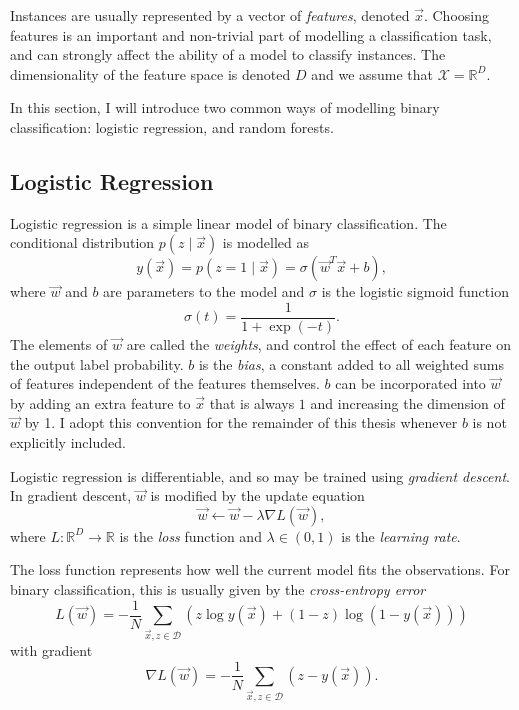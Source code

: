     Instances are usually represented by a vector of \emph{features}, denoted
    $\vec x$. Choosing features is an important and non-trivial part of
    modelling a classification task, and can strongly affect the ability of a
    model to classify instances. The dimensionality of the feature space is
    denoted $D$ and we assume that $\mathcal X = \mathbb{R}^D$.

    In this section, I will introduce two common ways of modelling binary
    classification: logistic regression, and random forests.

    \subsection{Logistic Regression}
    \label{sec:logistic-regression}

        Logistic regression is a simple linear model of binary classification.
        The conditional distribution $p(z \mid \vec x)$ is modelled as
        \[
            y(\vec x) = p(z = 1 \mid \vec x) = \sigma(\vec w^T \vec x + b),
        \]
        where $\vec w$ and $b$ are parameters to the model and $\sigma$ is the
        logistic sigmoid function
        \[
            \sigma(t) = \frac{1}{1 + \exp(-t)}.
        \]
        The elements of $\vec w$ are called the \emph{weights}, and control the
        effect of each feature on the output label probability. $b$ is the
        \emph{bias}, a constant added to all weighted sums of features
        independent of the features themselves. $b$ can be incorporated into
        $\vec w$ by adding an extra feature to $\vec x$ that is always $1$ and
        increasing the dimension of $\vec w$ by 1. I adopt this convention for
        the remainder of this thesis whenever $b$ is not explicitly included.

        Logistic regression is differentiable, and so may be trained using
        \emph{gradient descent}. In gradient descent, $\vec w$ is modified by
        the update equation
        \[
            \vec w \leftarrow \vec w - \lambda \nabla L(\vec w),
        \]
        where $L : \mathbb{R}^D \to \mathbb{R}$ is the \emph{loss} function and
        $\lambda \in (0, 1)$ is the \emph{learning rate}.

        The loss function represents how well the current model fits the
        observations. For binary classification, this is usually given by the
        \emph{cross-entropy error}
        \[
            L(\vec w) = -\frac{1}{N} \sum_{\vec x, z \in \mathcal D} \left(
                z \log y(\vec x) + (1 - z) \log (1 - y(\vec x))
            \right)
        \]
        with gradient
        \[
            \nabla L(\vec w) = -\frac{1}{N}
                \sum_{\vec x, z \in \mathcal D} \left(z - y(\vec x)\right).
        \]

